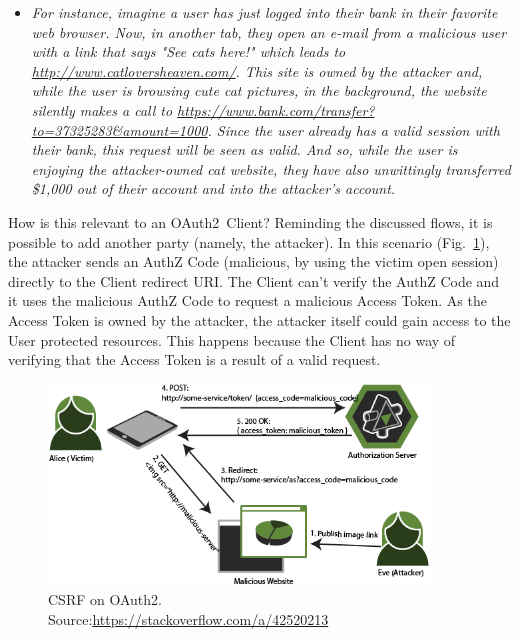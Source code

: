 \documentclass[a4paper,12pt]{article}
\def\oauth{OAuth2\xspace}
\def\myfig#1{Fig.~#1\xspace}
\begin{document}
\begin{itemize}
    \item[] \textit{For instance, imagine a user has just logged into their bank in their favorite web browser. Now, in another tab, they open an e-mail from a malicious user with a link that says "See cats here!" which leads to \url{http://www.catloversheaven.com/}. This site is owned by the attacker and, while the user is browsing cute cat pictures, in the background, the website silently makes a call to \url{https://www.bank.com/transfer?to=37325283\&amount=1000}. Since the user already has a valid session with their bank, this request will be seen as valid. And so, while the user is enjoying the attacker-owned cat website, they have also unwittingly transferred \$1,000 out of their account and into the attacker's account.}
\end{itemize}


How is this relevant to an \oauth\ Client? 
Reminding the discussed flows, it is possible to add another party (namely, the attacker). In this scenario (\myfig{\ref{fig:csrf}}), the attacker sends an AuthZ Code (malicious, by using the victim open session) directly to the Client redirect URI. The Client can't verify the AuthZ Code and it uses the malicious AuthZ Code to request a malicious Access Token. As the Access Token is owned by the attacker, the attacker itself could gain access to the User protected resources.
This happens because the Client has no way of verifying that the Access Token is a result of a valid request.

\begin{figure}[ht]
    \centering
    \includegraphics[width=0.9\textwidth]{figures/csrf.png}
    \caption[CSRF on \oauth]{CSRF on \oauth.\\\hspace{\textwidth}Source:\hspace{0.2cm}\url{https://stackoverflow.com/a/42520213}}
    \label{fig:csrf}
\end{figure}
\end{document}
